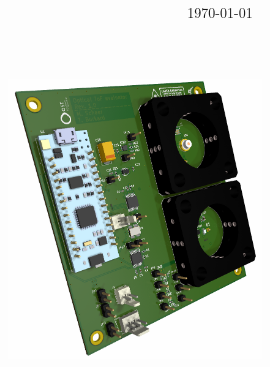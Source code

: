 \title{\vspace{-40pt}\begin{huge}\textbf{\vTitle}\end{huge}\\
\ \\ \vModule}
\author{\\\\\textbf{\vAuthorFirstName{} \vAuthorLastName}\\
    \vUniversity{}\\
    \\\\}

\date{\mydate\today}
\maketitle\thispagestyle{empty}  %

\vspace{35pt}

\begin{figure}[H]
    \centering
    \includegraphics[width=0.6\textwidth]{graphics/cover_picture.png}
\end{figure}

\vspace{30pt}

\begin{figure}[H]
    \centering
    \begin{minipage}[b]{0.3\textwidth}
        \label{fig:OST_Logo}
    \end{minipage}
\end{figure}

\pagebreak
